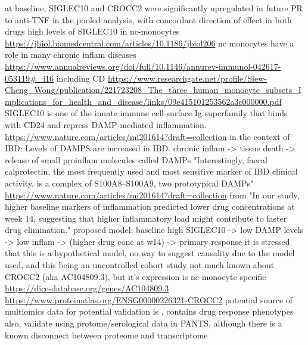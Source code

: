 \begin{outline}
\1 at baseline, SIGLEC10 and CROCC2 were significantly upregulated in future PR to anti-TNF in the pooled analysis, with concordant direction of effect in both drugs
    \2 high levels of SIGLEC10 in nc-monocytes \url{https://jbiol.biomedcentral.com/articles/10.1186/jbiol206} 
        \3 nc monocytes have a role in many chronic inflam diseases \url{https://www.annualreviews.org/doi/full/10.1146/annurev-immunol-042617-053119#_i16} including CD \url{https://www.researchgate.net/profile/Siew-Cheng_Wong/publication/221723208_The_three_human_monocyte_subsets_Implications_for_health_and_disease/links/09e415101253562a3c000000.pdf}
    \2 SIGLEC10 is one of the innate immune cell-surface Ig superfamily that binds with CD24 and repress DAMP-mediated inflammation. \url{https://www.nature.com/articles/mi201614?draft=collection}
    \2 in the context of IBD: Levels of DAMPS are increased in IBD. 
        \3 chronic inflam -> tissue death -> release of small proinflam molecules called DAMPs \autocite{desouza2016ImmunopathogenesisIBDCurrent}
        \3 "Interestingly, faecal calprotectin, the most frequently used and most sensitive marker of IBD clinical activity, is a complex of S100A8–S100A9, two prototypical DAMPs" \url{https://www.nature.com/articles/mi201614?draft=collection} \autocite{desouza2016ImmunopathogenesisIBDCurrent}
        \2 from \autocite{kennedy2019PredictorsAntiTNFTreatment} "In our study, higher baseline markers of inflammation predicted lower drug concentrations at week 14, suggesting that higher inflammatory load might contribute to faster drug elimination."
        \2 proposed model: baseline high SIGLEC10 -> low DAMP levels -> low inflam -> (higher drug conc at w14) -> primary response
            \3 it is stressed that this is a hypothetical model, no way to suggest causality due to the model used, and this being an uncontrolled cohort study
\1 not much known about CROCC2 (aka AC104809.3), but it's expression is nc-monocyte specific \url{https://dice-database.org/genes/AC104809.3} \url{https://www.proteinatlas.org/ENSG00000226321-CROCC2}
    \2 potential source of multiomics data for potential validation is \autocite{imhann20191000IBDProjectMultiomics}, contains drug response phenotypes
    \2 also, validate using protome/serological data in PANTS, although there is a known disconnect between proteome and transcriptome


\end{outline}
